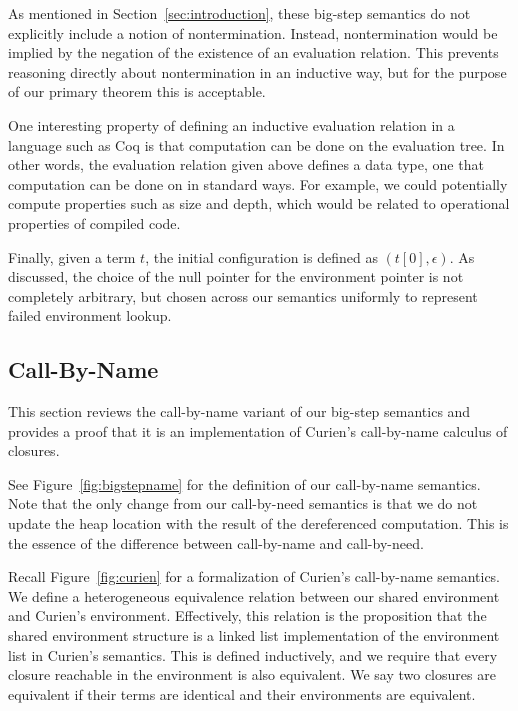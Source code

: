 As mentioned in Section~\ref{sec:introduction}, these big-step semantics do not
explicitly include a notion of nontermination. Instead, nontermination would be
implied by the negation of the existence of an evaluation relation. This
prevents reasoning directly about nontermination in an inductive way, but for
the purpose of our primary theorem this is acceptable. 

One interesting property of defining an inductive evaluation relation in a
language such as Coq is that computation can be done on the evaluation tree. In
other words, the evaluation relation given above defines a data type, one that
computation can be done on in standard ways. For example, we could potentially
compute properties such as size and depth, which would be related to operational
properties of compiled code. 

Finally, given a term $t$, the initial configuration is defined as
$\left(t\left[0\right], \epsilon\right)$. As discussed, the choice of the null
pointer for the environment pointer is not completely arbitrary, but chosen
across our semantics uniformly to represent failed environment lookup. 

\subsection{Call-By-Name}

This section reviews the call-by-name variant of our big-step semantics and
provides a proof that it is an implementation of Curien's call-by-name calculus
of closures. 

See Figure~\ref{fig:bigstepname} for the definition of our call-by-name
semantics. Note that the only change from our call-by-need semantics is that we
do not update the heap location with the result of the dereferenced computation.
This is the essence of the difference between call-by-name and call-by-need.

Recall Figure~\ref{fig:curien} for a formalization of Curien's call-by-name
semantics. We define a heterogeneous equivalence relation between our shared
environment and Curien's environment. Effectively, this relation is the
proposition that the shared environment structure is a linked list
implementation of the environment list in Curien's semantics. This is defined
inductively, and we require that every closure reachable in the environment is
also equivalent.  We say two closures are equivalent if their terms are
identical and their environments are equivalent. 

